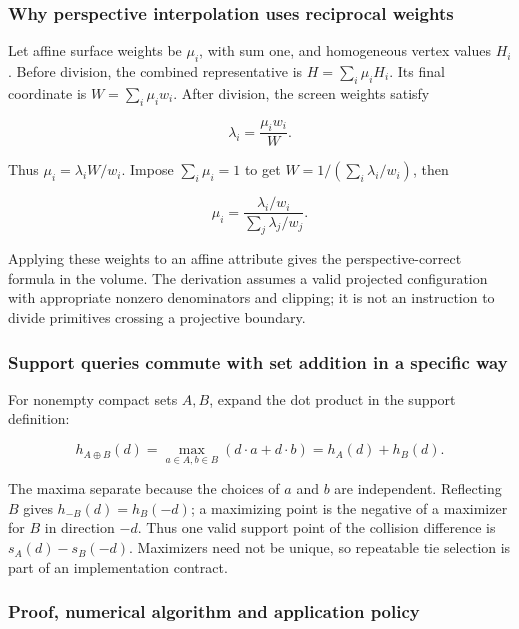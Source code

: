 \subsubsection{Why perspective interpolation uses reciprocal weights}\label{02-foundations-ii-ch039-why-perspective-interpolation-uses-reciprocal-weights}

Let affine surface weights be \(\mu_i\), with sum one, and homogeneous vertex values \(H_i\). Before division, the combined representative is \(H=\sum_i\mu_iH_i\). Its final coordinate is \(W=\sum_i\mu_iw_i\). After division, the screen weights satisfy

\[
\lambda_i=\frac{\mu_iw_i}{W}.
\]

Thus \(\mu_i=\lambda_iW/w_i\). Impose \(\sum_i\mu_i=1\) to get \(W=1/(\sum_i\lambda_i/w_i)\), then

\[
\mu_i=\frac{\lambda_i/w_i}{\sum_j\lambda_j/w_j}.
\]

Applying these weights to an affine attribute gives the perspective-correct formula in the volume. The derivation assumes a valid projected configuration with appropriate nonzero denominators and clipping; it is not an instruction to divide primitives crossing a projective boundary.

\subsubsection{Support queries commute with set addition in a specific way}\label{02-foundations-ii-ch039-support-queries-commute-with-set-addition-in-a-specific-way}

For nonempty compact sets \(A,B\), expand the dot product in the support definition:

\[
h_{A\oplus B}(d)=\max_{a\in A,b\in B}(d\cdot a+d\cdot b)
=h_A(d)+h_B(d).
\]

The maxima separate because the choices of \(a\) and \(b\) are independent. Reflecting \(B\) gives \(h_{-B}(d)=h_B(-d)\); a maximizing point is the negative of a maximizer for \(B\) in direction \(-d\). Thus one valid support point of the collision difference is \(s_A(d)-s_B(-d)\). Maximizers need not be unique, so repeatable tie selection is part of an implementation contract.

\subsubsection{Proof, numerical algorithm and application policy}\label{02-foundations-ii-ch039-proof-numerical-algorithm-and-application-policy}

